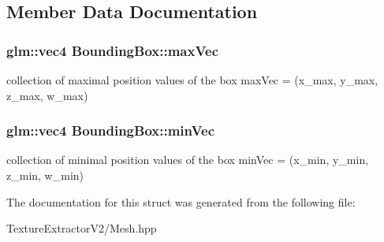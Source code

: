 \subsection{Member Data Documentation}
\hypertarget{struct_bounding_box_a45c73eef0083449f657b8e25247123fd}{}
\subsubsection[{max\+Vec}]{\setlength{\rightskip}{0pt plus 5cm}glm\+::vec4 Bounding\+Box\+::max\+Vec}\label{struct_bounding_box_a45c73eef0083449f657b8e25247123fd}
collection of maximal position values of the box max\+Vec = (x\+\_\+max, y\+\_\+max, z\+\_\+max, w\+\_\+max) \hypertarget{struct_bounding_box_af0404f650a91d7c3212a2bd9db9ada56}{}
\subsubsection[{min\+Vec}]{\setlength{\rightskip}{0pt plus 5cm}glm\+::vec4 Bounding\+Box\+::min\+Vec}\label{struct_bounding_box_af0404f650a91d7c3212a2bd9db9ada56}
collection of minimal position values of the box min\+Vec = (x\+\_\+min, y\+\_\+min, z\+\_\+min, w\+\_\+min) 

The documentation for this struct was generated from the following file\+:\begin{DoxyCompactItemize}
\item 
Texture\+Extractor\+V2/Mesh.\+hpp\end{DoxyCompactItemize}
